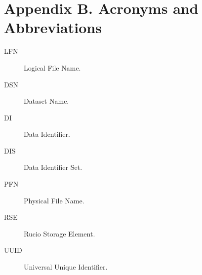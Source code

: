 \documentclass{atlasnote}
\begin{document}
\section*{Appendix B. Acronyms and Abbreviations}
\label{Acronyms_and_Abbreviations:acronyms-and-abbreviations}
\begin{description}
\item[{LFN}] Logical File Name.
\item[{DSN}] Dataset Name.
\item[{DI}] Data Identifier.
\item[{DIS}] Data Identifier Set.
\item[{PFN}] Physical File Name.
\item[{RSE}] Rucio Storage Element.
\item[{UUID}] Universal Unique Identifier.
\end{description}
\end{document}
